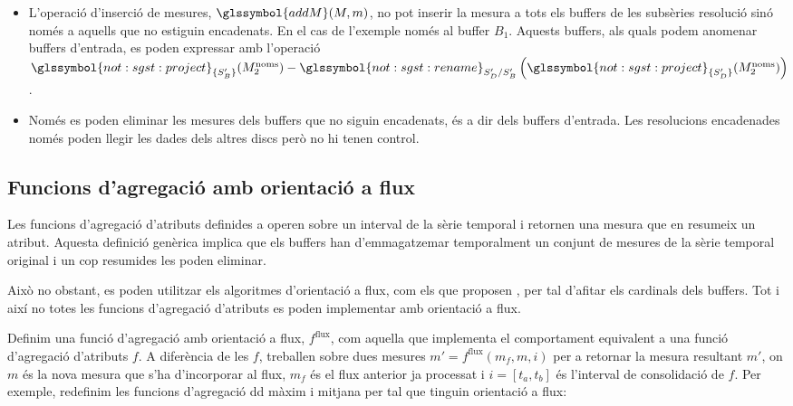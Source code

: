\begin{example} 
  \begin{itemize}
  \item L'operació d'inserció de mesures, $\glssymbol{addM}(M,m)$, no
    pot inserir la mesura a tots els buffers de les subsèries
    resolució sinó només a aquells que no estiguin encadenats. En el
    cas de l'exemple només al buffer $B_1$.  Aquests buffers, als
    quals podem anomenar buffers d'entrada, es poden expressar amb
    l'operació $ \glssymbol{not:sgst:project}_{\{S'_B\}}(
    M_2^{\text{noms}} ) -
    \glssymbol{not:sgst:rename}_{S'_D/S'_B}\left(
      \glssymbol{not:sgst:project}_{\{S'_D\}}( M_2^{\text{noms}}
      )\right)$.


  \item Només es poden eliminar les mesures dels buffers que no siguin
    encadenats, és a dir dels buffers d'entrada. Les resolucions
    encadenades només poden llegir les dades dels altres discs però
    no hi tenen control.

  \end{itemize}







\end{example}









\subsection{Funcions d'agregació amb orientació a flux}


Les funcions d'agregació d'atributs definides a
 operen sobre un interval de la sèrie
temporal i retornen una mesura que en resumeix un atribut. Aquesta
definició genèrica implica que els buffers han d'emmagatzemar
temporalment un conjunt de mesures de la sèrie temporal original i un
cop resumides les poden eliminar.

Això no obstant, es poden utilitzar els algoritmes d'orientació a
flux, com els que proposen \textcite{cormode08:pods}, per tal d'afitar
els cardinals dels buffers. Tot i així no totes les funcions
d'agregació d'atributs es poden implementar amb orientació a flux.




Definim una funció d'agregació amb orientació a flux, $f^\text{flux}$,
com aquella que implementa el comportament equivalent a una funció
d'agregació d'atributs $f$. A diferència de les $f$, treballen sobre
dues mesures $m'=f^\text{flux}(m_f,m,i)$ per a retornar la mesura
resultant $m'$, on $m$ és la nova mesura que s'ha d'incorporar al
flux, $m_f$ és el flux anterior ja processat i $i=[t_a,t_b]$ és
l'interval de consolidació de $f$.  Per exemple, redefinim les
funcions d'agregació \gls{dd} màxim i mitjana per tal que tinguin
orientació a flux:

